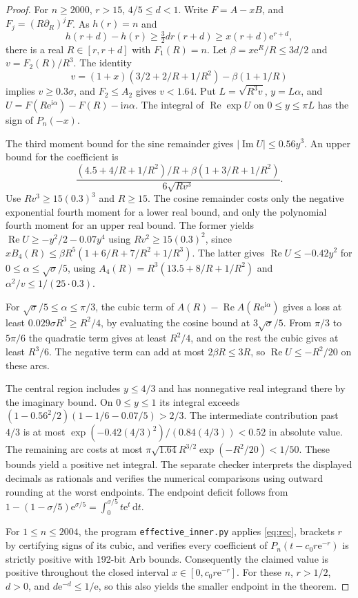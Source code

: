 \documentclass[11pt]{article}
\DeclareMathOperator{\Rea}{Re}
\DeclareMathOperator{\Ima}{Im}
\newcommand{\ee}{\mathrm e}
\newcommand{\ii}{\mathrm i}
\newcommand{\dd}{\mathrm d}
\begin{document}
\begin{proof}
For \(n\ge2000\), \(r>15\), \(4/5\le d<1\). Write \(F=A-xB\), and \(F_j=(R\partial_R)^jF\). As \(h(r)=n\) and
\[
 h(r+d)-h(r)\ge\tfrac32dr(r+d)\ge x(r+d)\ee^{r+d},
\]
there is a real \(R\in[r,r+d]\) with \(F_1(R)=n\). Let \(\beta=x\ee^R/R\le3d/2\) and \(v=F_2(R)/R^3\). The identity
\[
 v=(1+x)(3/2+2/R+1/R^2)-\beta(1+1/R)
\]
implies \(v\ge 0.3\sigma\), and \(F_2\le A_2\) gives \(v<1.64\). Put \(L=\sqrt{R^3v}\), \(y=L\alpha\), and \(U=F(R\ee^{\ii\alpha})-F(R)-\ii n\alpha\). The integral of \(\Rea\exp U\) on \(0\le y\le\pi L\) has the sign of \(P_n(-x)\).

The third moment bound for the sine remainder gives \(|\Ima U|\le0.56y^3\). An upper bound for the coefficient is
\[
 \frac{(4.5+4/R+1/R^2)/R+\beta(1+3/R+1/R^2)}
      {6\sqrt{Rv^3}} .
\]
Use \(Rv^3\ge15(0.3)^3\) and \(R\ge15\). The cosine remainder costs only the negative exponential fourth moment for a lower real bound, and only the polynomial fourth moment for an upper real bound. The former yields \(\Rea U\ge-y^2/2-0.07y^4\) using \(Rv^2\ge15(0.3)^2\), since \(x B_4(R)\le\beta R^5(1+6/R+7/R^2+1/R^3)\). The latter gives \(\Rea U\le-0.42y^2\) for \(0\le\alpha\le\sqrt{\sigma}/5\), using \(A_4(R)=R^3(13.5+8/R+1/R^2)\) and \(\alpha^2/v\le 1/(25\cdot0.3)\).

For \(\sqrt{\sigma}/5\le\alpha\le\pi/3\), the cubic term of \(A(R)-\Rea A(R\ee^{\ii\alpha})\) gives a loss at least \(0.029\sigma R^3\ge R^2/4\), by evaluating the cosine bound at \(3\sqrt{\sigma}/5\). From \(\pi/3\) to \(5\pi/6\) the quadratic term gives at least \(R^2/4\), and on the rest the cubic gives at least \(R^3/6\). The negative term can add at most \(2\beta R\le3R\), so \(\Rea U\le-R^2/20\) on these arcs.

The central region includes \(y\le4/3\) and has nonnegative real integrand there by the imaginary bound. On \(0\le y\le1\) its integral exceeds
\((1-0.56^2/2)(1-1/6-0.07/5)>2/3\).
The intermediate contribution past \(4/3\) is at most \(\exp(-0.42(4/3)^2)/(0.84(4/3))<0.52\) in absolute value. The remaining arc costs at most \(\pi\sqrt{1.64}R^{3/2}\exp(-R^2/20)<1/50\). These bounds yield a positive net integral. The separate checker interprets the displayed decimals as rationals and verifies the numerical comparisons using outward rounding at the worst endpoints. The endpoint deficit follows from
\(1-(1-\sigma/5)\ee^{\sigma/5}=\int_0^{\sigma/5} t\ee^t\,\dd t\).

For \(1\le n\le2004\), the program \texttt{effective\_inner.py} applies \eqref{eq:rec}, brackets \(r\) by certifying signs of its cubic, and verifies every coefficient of \(P_n(t-c_0r\ee^{-r})\) is strictly positive with 192-bit Arb bounds. Consequently the claimed value is positive throughout the closed interval \(x\in[0,c_0r\ee^{-r}]\). For these \(n\), \(r>1/2\), \(d>0\), and \(d\ee^{-d}\le1/\ee\), so this also yields the smaller endpoint in the theorem.
\end{proof}
\end{document}
